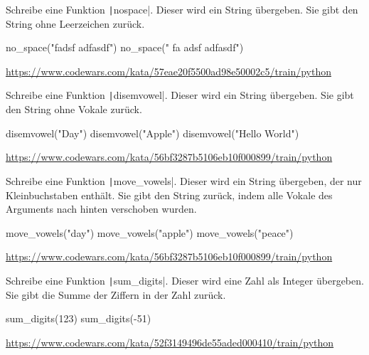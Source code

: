 \documentclass[class=scrartcl, crop=false]{standalone}
\begin{document}
\begin{aufgabe}
Schreibe eine Funktion \texttt|nospace|. Dieser wird ein String übergeben. Sie gibt den String ohne Leerzeichen zurück.

\begin{pyconsole}
no_space("fadsf  adfasdf")
no_space("  fa adsf  adfasdf")
\end{pyconsole}


\url{https://www.codewars.com/kata/57eae20f5500ad98e50002c5/train/python}
\end{aufgabe}


\begin{aufgabe}
Schreibe eine Funktion \texttt|disemvowel|. Dieser wird ein String übergeben. Sie gibt den String ohne Vokale zurück.

\begin{pyconsole}
disemvowel("Day")
disemvowel("Apple")
disemvowel("Hello World")
\end{pyconsole}


\url{https://www.codewars.com/kata/56bf3287b5106eb10f000899/train/python}
\end{aufgabe}


\begin{aufgabe}
Schreibe eine Funktion \texttt|move_vowels|. Dieser wird ein String übergeben, der nur Kleinbuchstaben enthält. Sie gibt den String zurück, indem alle Vokale des Arguments nach hinten verschoben wurden.

\begin{pyconsole}
move_vowels("day")
move_vowels("apple")
move_vowels("peace")
\end{pyconsole}


\url{https://www.codewars.com/kata/56bf3287b5106eb10f000899/train/python}
\end{aufgabe}



\begin{aufgabe}
Schreibe eine Funktion \texttt|sum_digits|. Dieser wird eine Zahl als Integer übergeben. Sie gibt die Summe der Ziffern in der Zahl zurück.
\begin{pyconsole}
sum_digits(123)
sum_digits(-51)
\end{pyconsole}


\url{https://www.codewars.com/kata/52f3149496de55aded000410/train/python}
\end{aufgabe}
\end{document}
